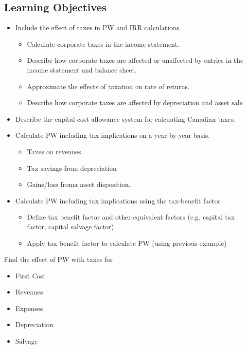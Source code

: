 \subsection{Learning Objectives}
\begin{summary}
    \begin{itemize}
        \item Include the effect of taxes in PW and IRR calculations.
        \begin{itemize}
            \item Calculate corporate taxes in the income statement.
            \item Describe how corporate taxes are affected or unaffected by entries in the income statement and balance sheet.
            \item Approximate the effects of taxation on rate of returns.
            \item Describe how corporate taxes are affected by depreciation and asset sale
        \end{itemize}
        \item Describe the capital cost allowance system for calcuating Canadian taxes.
        \item Calculate PW including tax implications on a year-by-year basis.
        \begin{itemize}
            \item Taxes on revenues
            \item Tax savings from depreciation
            \item Gains/loss froma asset disposition.
        \end{itemize}
        \item Calculate PW including tax implications using the tax-benefit factor
        \begin{itemize}
            \item Define tax benefit factor and other equivalent factors (e.g. capital tax factor, capital salvage factor)
            \item Apply tax benefit factor to calculate PW (using previous example)
        \end{itemize}
    \end{itemize}
\end{summary}

\begin{intuition}
    Find the effect of PW with taxes for 
    \begin{itemize}
        \item First Cost
        \item Revenues
        \item Expenses
        \item Depreciation
        \item Salvage
    \end{itemize}

\end{intuition}

